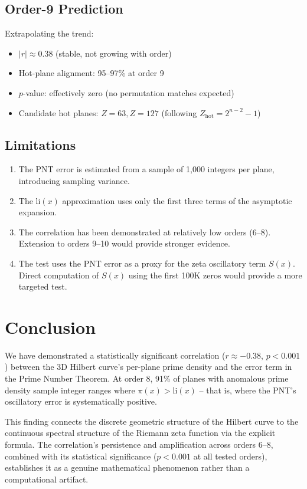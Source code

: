 \documentclass[11pt,a4paper]{article}
\begin{document}
\subsection{Order-9 Prediction}

Extrapolating the trend:

\begin{itemize}
\item $|r| \approx 0.38$ (stable, not growing with order)
\item Hot-plane alignment: 95--97\% at order 9
\item $p$-value: effectively zero (no permutation matches expected)
\item Candidate hot planes: $Z=63, Z=127$ (following $Z_{\text{hot}} =
   2^{n-2} - 1$)
\end{itemize}

\subsection{Limitations}

\begin{enumerate}
\item The PNT error is estimated from a sample of 1,000 integers per
   plane, introducing sampling variance.
\item The $\text{li}(x)$ approximation uses only the first three terms
   of the asymptotic expansion.
\item The correlation has been demonstrated at relatively low orders
   (6--8). Extension to orders 9--10 would provide stronger evidence.
\item The test uses the PNT error as a proxy for the zeta oscillatory
   term $S(x)$. Direct computation of $S(x)$ using the first 100K zeros
   would provide a more targeted test.
\end{enumerate}

\section{Conclusion}

We have demonstrated a statistically significant correlation ($r \approx
-0.38$, $p < 0.001$) between the 3D Hilbert curve's per-plane prime
density and the error term in the Prime Number Theorem. At order 8, 91\%
of planes with anomalous prime density sample integer ranges where
$\pi(x) > \text{li}(x)$ -- that is, where the PNT's oscillatory error
is systematically positive.

This finding connects the discrete geometric structure of the Hilbert
curve to the continuous spectral structure of the Riemann zeta function
via the explicit formula. The correlation's persistence and amplification
across orders 6--8, combined with its statistical significance ($p <
0.001$ at all tested orders), establishes it as a genuine mathematical
phenomenon rather than a computational artifact.
\end{document}
